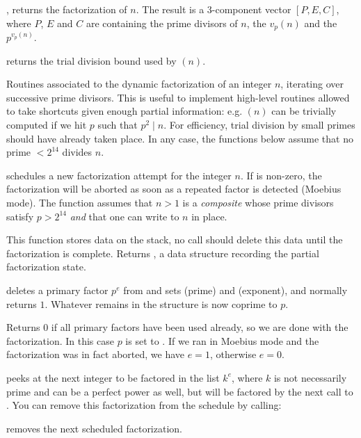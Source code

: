 , returns the factorization of $n$. The result
is a $3$-component vector $[P,E,C]$, where $P$, $E$ and $C$ are
 containing the prime divisors of $n$, the $v_p(n)$
and the $p^{v_p(n)}$.

 returns the trial division bound used by
$(n)$.


Routines associated to the dynamic factorization of an integer $n$, iterating
over successive prime divisors. This is useful to implement high-level
routines allowed to take shortcuts given enough partial information: e.g.
$(n)$ can be trivially computed if we hit $p$ such that $p^2
\mid n$. For efficiency, trial division by small primes should have already
taken place. In any case, the functions below assume that no prime $< 2^{14}$
divides $n$.

 schedules a new factorization
attempt for the integer $n$. If  is non-zero, the factorization
will be aborted as soon as a repeated factor is detected (Moebius mode).
The function assumes that $n > 1$ is a \emph{composite}  whose prime
divisors satisfy $p > 2^{14}$ \emph{and} that one can write to $n$ in place.

This function stores data on the stack, no  call should
delete this data until the factorization is complete. Returns ,
a data structure recording the partial factorization state.

 deletes a primary factor
$p^e$ from  and sets  (prime) and  (exponent), and
normally returns $1$. Whatever remains in the  structure is now
coprime to $p$.

Returns $0$ if all primary factors have been used already, so we are done
with the factorization. In this case $p$ is set to . If we ran in
Moebius mode and the factorization was in fact aborted, we have $e = 1$,
otherwise $e = 0$.

 peeks at the next integer
to be factored in the list $k^e$, where $k$ is not necessarily prime
and can be a perfect power as well, but will be factored by the next call to
. You can remove this factorization from the schedule by
calling:

 removes the next scheduled factorization.

